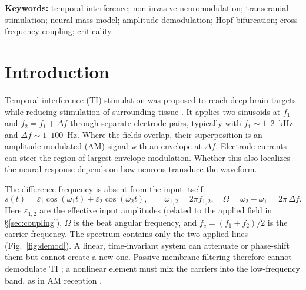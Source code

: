 \documentclass[11pt,a4paper]{article}
\begin{document}
\smallskip
\noindent\textbf{Keywords:} temporal interference; non-invasive neuromodulation;
transcranial stimulation; neural mass model; amplitude demodulation; Hopf bifurcation;
cross-frequency coupling; criticality.

\clearpage
\tableofcontents
\clearpage

\section{Introduction}
Temporal-interference (TI) stimulation was proposed to reach deep brain targets while
reducing stimulation of surrounding tissue \cite{grossman2017}. It applies two sinusoids at
$f_1$ and $f_2=f_1+\Delta f$ through separate electrode pairs, typically with
$f_1\sim1$--$2$~kHz and $\Delta f\sim1$--$100$~Hz. Where the fields overlap, their
superposition is an amplitude-modulated (AM) signal with an envelope at $\Delta f$.
Electrode currents can steer the region of largest envelope modulation. Whether this
also localizes the neural response depends on how neurons transduce the waveform.

The difference frequency is absent from the input itself:
\begin{equation}
s(t)=\varepsilon_1\cos(\omega_1 t)+\varepsilon_2\cos(\omega_2 t),\qquad
\omega_{1,2}=2\pi f_{1,2},\quad \Omega=\omega_2-\omega_1=2\pi\,\Delta f .
\label{eq:am}
\end{equation}
Here $\varepsilon_{1,2}$ are the effective input amplitudes (related to the applied field
in \S\ref{sec:coupling}), $\Omega$ is the beat angular frequency, and
$f_c=(f_1+f_2)/2$ is the carrier frequency. The spectrum contains only the two applied
lines (Fig.~\ref{fig:demod}). A linear, time-invariant system can attenuate or phase-shift
them but cannot create a new one. Passive membrane filtering therefore cannot
demodulate TI \cite{mirzakhalili2020}; a nonlinear element must mix the carriers into
the low-frequency band, as in AM reception \cite{nahin2001}.
\end{document}
